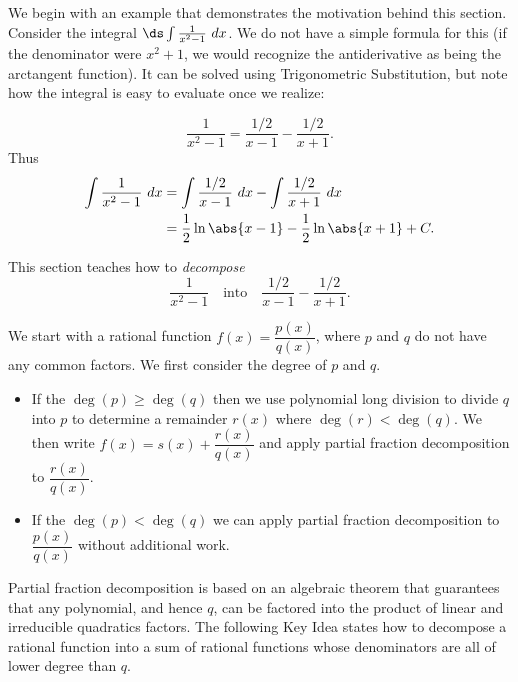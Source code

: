 We begin with an example that demonstrates the motivation behind this section. Consider the integral $\ds\int \frac{1}{x^2-1}\ dx$. We do not have a simple formula for this (if the denominator were $x^2+1$, we would recognize the antiderivative as being the arctangent function). It can be solved using Trigonometric Substitution, but note how the integral is easy to evaluate once we realize:

$$\frac{1}{x^2-1} = \frac{1/2}{x-1} - \frac{1/2}{x+1}.$$
Thus 
\begin{align*}
\int\frac{1}{x^2-1}\ dx &= \int\frac{1/2}{x-1}\ dx - \int\frac{1/2}{x+1}\ dx \\
			&= \frac12\ln\abs{x-1}-\frac12\ln\abs{x+1}+C.
\end{align*}

This section teaches how to \textit{decompose}
\[\frac1{x^2-1}\quad  \text{into}\quad  \frac{1/2}{x-1}-\frac{1/2}{x+1}.\]

We start with a rational function $f(x)=\dfrac{p(x)}{q(x)}$, where $p$ and $q$ do not have any common factors. We first consider the degree of $p$ and $q$. 
\begin{itemize}
	\item If the $\deg(p)\ge\deg(q)$ then we use polynomial long division to divide $q$ into $p$ to determine a remainder $r(x)$ where $\deg(r)<\deg(q)$. We then write $f(x) =s(x)+\dfrac{r(x)}{q(x)}$ and apply partial fraction decomposition to $\dfrac{r(x)}{q(x)}$.
	\item If the $\deg(p)<\deg(q)$ we can apply partial fraction decomposition to $\dfrac{p(x)}{q(x)}$ without additional work.
\end{itemize}

Partial fraction decomposition is based on an algebraic theorem that guarantees that any polynomial, and hence $q$, can be factored into the product of linear and irreducible quadratics factors. The following Key Idea states how to decompose a rational function into a sum of rational functions whose denominators are all of lower degree than $q$.


